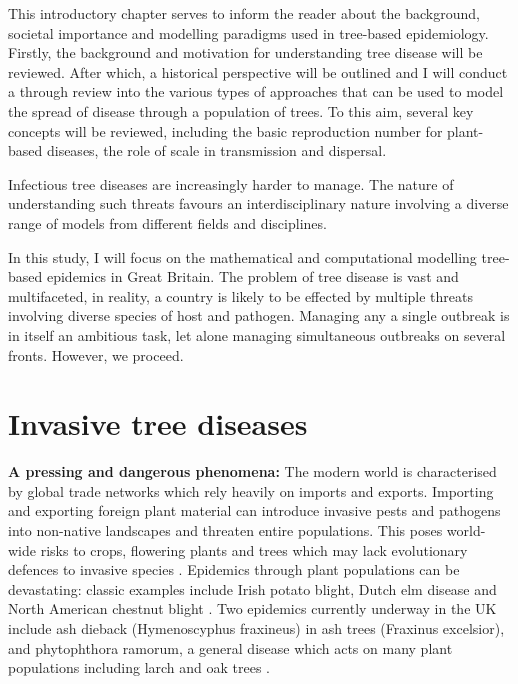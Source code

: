 This introductory chapter serves to inform the reader about the background, societal importance and modelling paradigms used in tree-based epidemiology. Firstly, the background and motivation for understanding tree disease will be reviewed. After which, a historical perspective will be outlined and I will conduct a through review into the various types of approaches that can be used to model the spread of disease through a population of trees. To this aim, several key concepts will be reviewed, including the basic reproduction number for plant-based diseases, the role of scale in transmission and dispersal. 

Infectious tree diseases are increasingly harder to manage. The nature of understanding such threats favours an interdisciplinary nature involving a diverse range of models from different fields and disciplines.

In this study, I will focus on the mathematical and computational modelling tree-based epidemics in Great Britain. The problem of tree disease is vast and multifaceted, in reality, a country is likely to be effected by multiple threats involving diverse species of host and pathogen. Managing any a single outbreak is in itself an ambitious task, let alone managing simultaneous outbreaks on several fronts. However, we proceed.\\

\section{Invasive tree diseases}
\textbf{A pressing and dangerous phenomena: } The modern world is characterised by global trade networks which rely heavily on imports and exports. Importing and exporting foreign plant material can introduce invasive pests and pathogens into non-native landscapes and threaten entire populations. This poses world-wide risks to crops, flowering plants and trees which may lack evolutionary defences to invasive species \cite{doi:10.1002/9781444329988.ch8}. Epidemics through plant populations can be devastating: classic examples include Irish potato blight, Dutch elm disease \cite{doi:10.1111/j.1365-3059.2010.02391.x} and North American chestnut blight \cite{doi:10.1002/9780470535486.ch7}. Two epidemics currently underway in the UK include ash dieback (Hymenoscyphus fraxineus) in ash trees (Fraxinus excelsior),  \cite{ash-dieback-costs} and phytophthora ramorum, a general disease which acts on many plant populations including larch and oak trees \cite{p.ramourum}.

